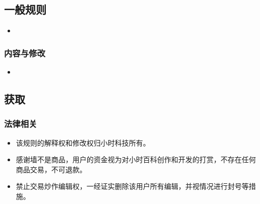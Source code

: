 \subsection{一般规则}
\begin{itemize}
\item 
\end{itemize}


\subsubsection{内容与修改}
\begin{itemize}
\item 
\end{itemize}

\subsection{获取}

\subsubsection{法律相关}
\begin{itemize}
\item 该规则的解释权和修改权归小时科技所有。
\item 感谢墙不是商品，用户的资金视为对小时百科创作和开发的打赏，不存在任何商品交易，不可退款。
\item 禁止交易炒作编辑权，一经证实删除该用户所有编辑，并视情况进行封号等措施。
\end{itemize}

